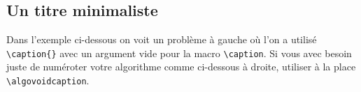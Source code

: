 \documentclass[12pt,a4paper]{article}
\begin{document}

\subsection{Un titre minimaliste}

Dans l'exemple ci-dessous on voit un problème à gauche où l'on a utilisé \verb+\caption{}+ avec un argument vide pour la macro \verb+\caption+.
Si vous avec besoin juste de numéroter votre algorithme comme ci-dessous à droite, utiliser à la place \verb+\algovoidcaption+.


\begin{multicols}{2}    




\end{multicols}
\end{document}

